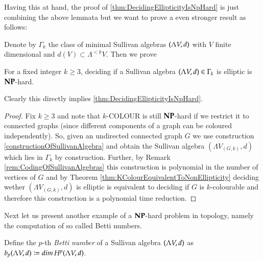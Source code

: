  Having this at hand, the proof of \ref{thm:DecidingEllipticityIsNpHard} is just combining the above lemmata but we 
 want to prove a even stronger result as follows:
 
 Denote by $\Gamma_k$ the class of minimal Sullivan algebras $(\Lambda V,d)$ with $V$ finite dimensional and
 $d(V) \subset \Lambda^{< k} V$. Then we prove
 
 \begin{Theorem}
  For a fixed integer $k \geq 3$, deciding if a Sullivan algebra $(\Lambda V,d) \in \Gamma_k$ is elliptic is $\mathbf{NP}$-hard. 
 \end{Theorem}

 Clearly this directly implies \ref{thm:DecidingEllipticityIsNpHard}.
 \begin{proof}
  Fix $k \geq 3$ and note that $k$-COLOUR is still $\mathbf{NP}$-hard if we restrict it to connected graphs (since different
  components of a graph can be coloured independently). So, given an undirected connected graph $G$ we use
  construction \ref{constructionOfSullivanAlgebra} and obtain the Sullivan algebra $(\Lambda V_{(G,k)},d)$ which lies
  in $\Gamma_k$ by construction. Further, by Remark \ref{rem:CodingOfSullivanAlgebras} this construction is polynomial
  in the number of vertices of $G$ and by Theorem \ref{thm:KColourEquivalentToNonEllipticity} deciding wether
  $(\Lambda V_{(G,k)},d)$ is elliptic is equivalent to deciding if $G$ is $k$-colourable and therefore this construction 
  is a polynomial time reduction.
 \end{proof}

 Next let us present another example of a $\mathbf{NP}$-hard problem in topology, namely the computation
 of so called Betti numbers.
 
 \begin{Definition}
  Define the $p$-th \emph{Betti number} of a Sullivan algebra $(\Lambda V,d)$ as \newline 
  ${b_p (\Lambda V,d) \coloneqq dim \, H^p (\Lambda V,d)}$.
 \end{Definition}


 

